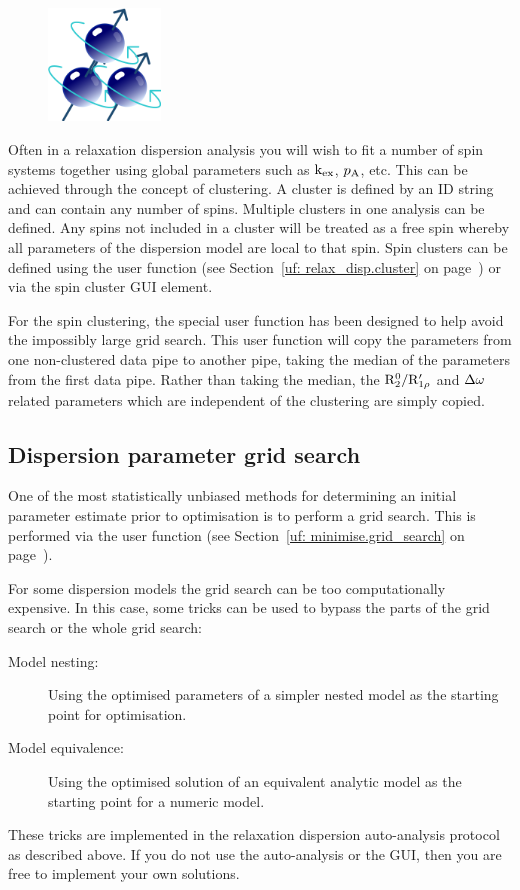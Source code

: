 \begin{figure}[h]
  \includegraphics[width=3cm, bb=14 14 399 399]{graphics/misc/cluster_600x600}
\end{figure}

Often in a relaxation dispersion analysis you will wish to fit a number of spin systems together using global parameters such as $\textrm{k}_{\textrm{ex}}$, $p_{\textrm{A}}$, etc.
This can be achieved through the concept of clustering.
A cluster is defined by an ID string and can contain any number of spins.
Multiple clusters in one analysis can be defined.
Any spins not included in a cluster will be treated as a free spin whereby all parameters of the dispersion model are local to that spin.
Spin clusters can be defined using the  user function (see Section~\ref{uf: relax_disp.cluster} on page~\pageref{uf: relax_disp.cluster}) or via the spin cluster GUI element.

For the spin clustering, the special  user function has been designed to help avoid the impossibly large grid search.
This user function will copy the parameters from one non-clustered data pipe to another pipe, taking the median of the parameters from the first data pipe.
Rather than taking the median, the $\mathrm{R}_2^0/\mathrm{R}_{1\rho}'$ and $\Delta\omega$ related parameters which are independent of the clustering are simply copied.



\subsection{Dispersion parameter grid search}
\label{sect: Dispersion parameter grid search}

One of the most statistically unbiased methods for determining an initial parameter estimate prior to optimisation is to perform a grid search.
This is performed via the  user function (see Section~\ref{uf: minimise.grid_search} on page~\pageref{uf: minimise.grid_search}).


For some dispersion models the grid search can be too computationally expensive.
In this case, some tricks can be used to bypass the parts of the grid search or the whole grid search:
\begin{description}
  \item[Model nesting:]  Using the optimised parameters of a simpler nested model as the starting point for optimisation.
  \item[Model equivalence:]  Using the optimised solution of an equivalent analytic model as the starting point for a numeric model.
\end{description}
These tricks are implemented in the relaxation dispersion auto-analysis protocol as described above.
If you do not use the auto-analysis or the GUI, then you are free to implement your own solutions.

